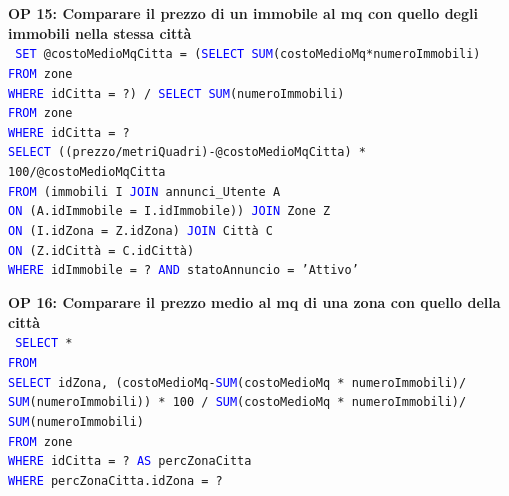 \documentclass[a4paper,12pt]{report}
\begin{document}
            \noindent
            \textbf{OP 15: Comparare il prezzo di un immobile al mq con quello degli immobili nella stessa città} \\
            \texttt{
                \textcolor{blue}{SET} @costoMedioMqCitta = (\textcolor{blue}{SELECT SUM}(costoMedioMq*numeroImmobili) \\
                    \null\qquad\qquad\qquad\qquad\qquad\qquad\quad\textcolor{blue}{FROM} zone \\
                    \null\qquad\qquad\qquad\qquad\qquad\qquad\quad\textcolor{blue}{WHERE} idCitta = ?) / \textcolor{blue}{SELECT SUM}(numeroImmobili) \\
                        \null\qquad\qquad\qquad\qquad\qquad\qquad\qquad\qquad\qquad\qquad\qquad\qquad\textcolor{blue}{FROM} zone  \\
                        \null\qquad\qquad\qquad\qquad\qquad\qquad\qquad\qquad\qquad\qquad\qquad\qquad\textcolor{blue}{WHERE} idCitta = ? \\
                \textcolor{blue}{SELECT} ((prezzo/metriQuadri)-@costoMedioMqCitta) * 100/@costoMedioMqCitta \\
                \textcolor{blue}{FROM} (immobili I \textcolor{blue}{JOIN} annunci\_Utente A  \\
                \textcolor{blue}{ON} (A.idImmobile = I.idImmobile)) \textcolor{blue}{JOIN} Zone Z \\
                \textcolor{blue}{ON} (I.idZona = Z.idZona) \textcolor{blue}{JOIN} Città C \\
                \textcolor{blue}{ON} (Z.idCittà = C.idCittà) \\
                \textcolor{blue}{WHERE} idImmobile = ? \textcolor{blue}{AND} statoAnnuncio = 'Attivo' \\
            }

            \noindent
            \textbf{OP 16: Comparare il prezzo medio al mq di una zona con quello della città} \\
            \texttt{
                \textcolor{blue}{SELECT} * \\
                \textcolor{blue}{FROM}  \\
                \textcolor{blue}{SELECT} idZona, (costoMedioMq-\textcolor{blue}{SUM}(costoMedioMq * numeroImmobili)/ \\
                \textcolor{blue}{SUM}(numeroImmobili)) * 100 / \textcolor{blue}{SUM}(costoMedioMq * numeroImmobili)/ \\
                \textcolor{blue}{SUM}(numeroImmobili) \\
                \textcolor{blue}{FROM} zone \\
                \textcolor{blue}{WHERE} idCitta = ? \textcolor{blue}{AS} percZonaCitta\\
                \textcolor{blue}{WHERE} percZonaCitta.idZona = ? \\
            }
\end{document}
